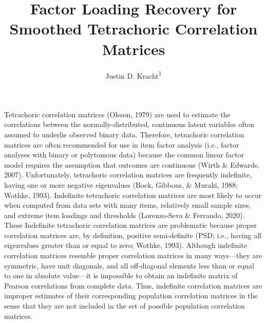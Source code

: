 \documentclass[
  english,
  man]{apa6}
\title{Factor Loading Recovery for Smoothed Tetrachoric Correlation Matrices}
\author{Justin D. Kracht\textsuperscript{1}}
\date{}
\affiliation{\vspace{0.5cm}\textsuperscript{1} University of Minnesota}
\begin{document}
\maketitle

\newcommand{\Rsm}{\mathbf{R}_{\textrm{Sm}}}
\newcommand{\Rpop}{\mathbf{R}_{\textrm{Pop}}}
\newcommand{\Rnpd}{\mathbf{R}_{-}}
\newcommand{\Rapa}{\mathbf{R}_{\textrm{APA}}}
\newcommand{\Rby}{\mathbf{R}_{\textrm{BY}}}
\newcommand{\Rkb}{\mathbf{R}_{\textrm{KB}}}
\newcommand{\dg}{\textrm{dg}}

\newcommand{\RMSE}{\textrm{RMSE}(\mathbf{F}, \hat{\mathbf{F}})}
\newcommand{\Ds}{\mathrm{D}_{\mathrm{s}}(\Rsm, \Rpop)}

Tetrachoric correlation matrices (Olsson, 1979) are used to estimate the correlations between the normally-distributed, continuous latent variables often assumed to underlie observed binary data. Therefore, tetrachoric correlation matrices are often recommended for use in item factor analysis (i.e., factor analyses with binary or polytomous data) because the common linear factor model requires the assumption that outcomes are continuous (Wirth \& Edwards, 2007). Unfortunately, tetrachoric correlation matrices are frequently indefinite, having one or more negative eigenvalues (Bock, Gibbons, \& Muraki, 1988; Wothke, 1993). Indefinite tetrachoric correlation matrices are most likely to occur when computed from data sets with many items, relatively small sample sizes, and extreme item loadings and thresholds (Lorenzo-Seva \& Ferrando, 2020). These Indefinite tetrachoric correlation matrices are problematic because proper correlation matrices are, by definition, positive semi-definite (PSD; i.e., having all eigenvalues greater than or equal to zero; Wothke, 1993). Although indefinite correlation matrices resemble proper correlation matrices in many ways---they are symmetric, have unit diagonals, and all off-diagonal elements less than or equal to one in absolute value---it is impossible to obtain an indefinite matrix of Pearson correlations from complete data. Thus, indefinite correlation matrices are improper estimates of their corresponding population correlation matrices in the sense that they are not included in the set of possible population correlation matrices.
\end{document}
